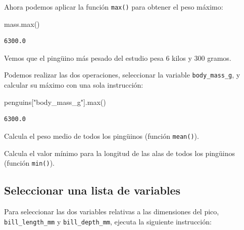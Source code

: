 \documentclass[
  a4paper,
  noprof,
  12pt,
  notoc,
  nosols,
  nobib]{mnye}
\newenvironment{Shaded}{\begin{snugshade}}{\end{snugshade}}
\newcommand{\BuiltInTok}[1]{\textcolor[rgb]{0.00,0.23,0.31}{#1}}
\newcommand{\NormalTok}[1]{\textcolor[rgb]{0.00,0.23,0.31}{#1}}
\newcommand{\StringTok}[1]{\textcolor[rgb]{0.13,0.47,0.30}{#1}}
\renewenvironment{exercise}[1][]{
            \if\relax\detokenize{#1}\relax
                \ex
            \else
                \ex[note={#1}]
            \fi
        }{\endex}
\theoremstyle{definition}
\newtheorem{exercise}{Ejercicio}[section]
\theoremstyle{remark}
\begin{document}
Ahora podemos aplicar la función \texttt{max()} para obtener el peso
máximo:

\begin{Shaded}
\begin{Highlighting}[]
\NormalTok{mass.}\BuiltInTok{max}\NormalTok{()}
\end{Highlighting}
\end{Shaded}

\begin{verbatim}
6300.0
\end{verbatim}

Vemos que el pingüino más pesado del estudio pesa \(6\) kilos y \(300\)
gramos.

Podemos realizar las dos operaciones, seleccionar la variable
\texttt{body\_mass\_g}, y calcular su máximo con una sola instrucción:

\begin{Shaded}
\begin{Highlighting}[]
\NormalTok{penguins[}\StringTok{"body\_mass\_g"}\NormalTok{].}\BuiltInTok{max}\NormalTok{()}
\end{Highlighting}
\end{Shaded}

\begin{verbatim}
6300.0
\end{verbatim}

\begin{exercise}[]%
\protect\hypertarget{exr-subset-variable-1}{}\label{exr-subset-variable-1}%
Calcula el peso medio de todos los pingüinos (función \texttt{mean()}).

\end{exercise}

\begin{exercise}[]%
\protect\hypertarget{exr-subset-variable-2}{}\label{exr-subset-variable-2}%
Calcula el valor mínimo para la longitud de las alas de todos los
pingüinos (función \texttt{min()}).

\end{exercise}

\hypertarget{seleccionar-una-lista-de-variables}{%
\subsection{Seleccionar una lista de
variables}\label{seleccionar-una-lista-de-variables}}

Para seleccionar las dos variables relativas a las dimensiones del pico,
\texttt{bill\_length\_mm} y \texttt{bill\_depth\_mm}, ejecuta la
siguiente instrucción:
\end{document}
